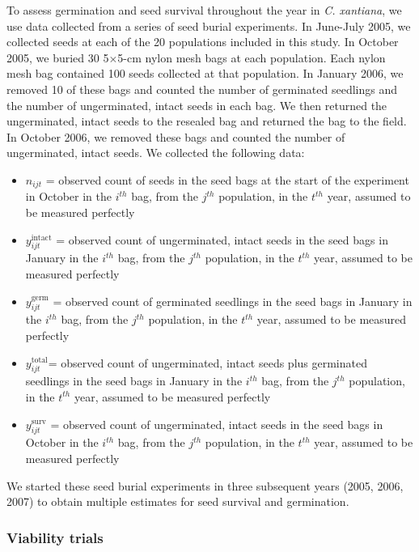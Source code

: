 \documentclass[12pt, oneside, titlepage]{article}   	%
\begin{document}
To assess germination and seed survival throughout the year in \textit{C. xantiana}, we use data collected from a series of seed burial experiments. In June-July 2005, we collected seeds at each of the 20 populations included in this study. In October 2005, we buried 30 5$\times$5-cm nylon mesh bags at each population. Each nylon mesh bag contained 100 seeds collected at that population. In January 2006, we removed 10 of these bags and counted the number of germinated seedlings and the number of ungerminated, intact seeds in each bag. We then returned the ungerminated, intact seeds to the resealed bag and returned the bag to the field. In October 2006, we removed these bags and counted the number of ungerminated, intact seeds. We collected the following data:

\begin{itemize}
	\item $n_{ijt}$ = observed count of seeds in the seed bags at the start of the experiment in October in the $i^{th}$ bag, from the $j^{th}$ population, in the $t^{th}$ year, assumed to be measured perfectly 
	\item $y^{\mathrm{intact}}_{ijt}$ = observed count of ungerminated, intact seeds in the seed bags in January in the $i^{th}$ bag, from the $j^{th}$ population, in the $t^{th}$ year,  assumed to be measured perfectly 
	\item $y^{\mathrm{germ}}_{ijt}$ = observed count of germinated seedlings in the seed bags in January in the $i^{th}$ bag, from the $j^{th}$ population, in the $t^{th}$ year, assumed to be measured perfectly 
	\item $y^{\mathrm{total}}_{ijt}$= observed count of ungerminated, intact seeds plus germinated seedlings in the seed bags in January in the $i^{th}$ bag, from the $j^{th}$ population, in the $t^{th}$ year, assumed to be measured perfectly 	
	\item $y^{\mathrm{surv}}_{ijt}$ = observed count of ungerminated, intact seeds in the seed bags in October in the $i^{th}$ bag, from the $j^{th}$ population, in the $t^{th}$ year, assumed to be measured perfectly 	
\end{itemize}

We started these seed burial experiments in three subsequent years (2005, 2006, 2007) to obtain multiple estimates for seed survival and germination. 

\subsubsection{Viability trials}
\end{document}
